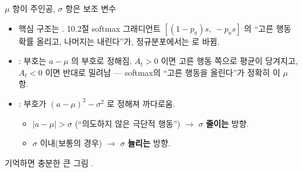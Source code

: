 \begin{frame}{$\mu$ 항이 주인공, $\sigma$ 항은 보조 변수}
  \begin{itemize}
    \item 핵심 구조는 . 10.2절 softmax 그래디언트
      $[(1-p_a)s,\ -p_as]$ 의 ``고른 행동 확률 올리고, 나머지는
      내린다''가, 정규분포에서는 로 바뀜.
    \item {}: 부호는 $a-\mu$ 의 부호로 정해짐.
      $A_t>0$ 이면 고른 행동 쪽으로 평균이 당겨지고, $A_t<0$
      이면 반대로 밀려남 — softmax의 ``고른 행동을 올린다''가
      정확히 이 $\mu$ 항.
    \item {}: 부호가 $(a-\mu)^2-\sigma^2$ 로 정해져
      까다로움.
      \begin{itemize}
        \item $|a-\mu|>\sigma$ (``의도하지 않은 극단적 행동'')
          $\to$ $\sigma$ \textbf{줄이는} 방향.
        \item $\sigma$ 이내(보통의 경우) $\to$ $\sigma$
          \textbf{늘리는} 방향.
      \end{itemize}
  \end{itemize}
  \begin{block}{기억하면 충분한 큰 그림}
    .
  \end{block}
\end{frame}
